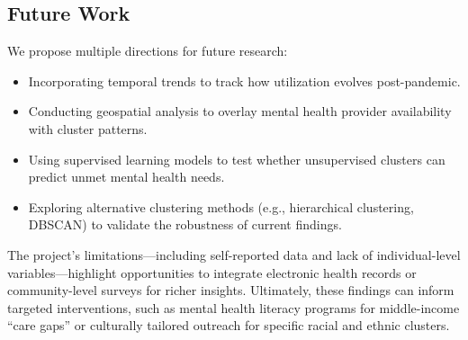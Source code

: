 \documentclass{article}
\begin{document}
\subsection{Future Work}

We propose multiple directions for future research:

\begin{itemize}
    \item Incorporating temporal trends to track how utilization evolves post-pandemic.
    \item Conducting geospatial analysis to overlay mental health provider availability with cluster patterns.
    \item Using supervised learning models to test whether unsupervised clusters can predict unmet mental health needs.
    \item Exploring alternative clustering methods (e.g., hierarchical clustering, DBSCAN) to validate the robustness of current findings.
\end{itemize}

The project’s limitations—including self-reported data and lack of individual-level variables—highlight opportunities to integrate electronic health records or community-level surveys for richer insights. Ultimately, these findings can inform targeted interventions, such as mental health literacy programs for middle-income ``care gaps'' or culturally tailored outreach for specific racial and ethnic clusters.
\end{document}
